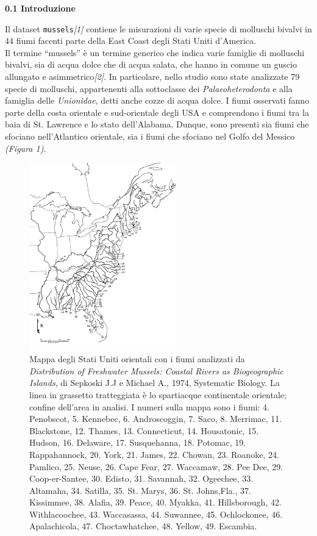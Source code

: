 \documentclass{article} %
\begin{document}
\newpage
\begin{flushleft}
\textbf{\Large 0.1 \: Introduzione}    
\end{flushleft}

Il dataset \texttt{mussels}\textit{[1]} contiene le misurazioni di varie specie di molluschi bivalvi  in 44 fiumi facenti parte della East Coast degli Stati Uniti d'America.\\ 
Il termine “mussels” è un termine generico che indica varie famiglie di molluschi bivalvi, sia di acqua dolce che di acqua salata, che hanno in comune un guscio allungato e asimmetrico\textit{[2]}. In particolare, nello studio sono state analizzate 79 specie di molluschi, appartenenti alla sottoclasse dei \textit{Palaeoheterodonta} e alla famiglia delle \textit{Unionidae}, detti anche cozze di acqua dolce. 
I fiumi osservati fanno parte della costa orientale e sud-orientale degli USA e comprendono i fiumi tra la baia di St. Lawrence e lo stato dell'Alabama. Dunque, sono presenti sia fiumi che sfociano nell'Atlantico orientale, sia i fiumi che sfociano nel Golfo del Messico \textit{(Figura 1)}. 

\begin{figure}[H]
    \centering
    \includegraphics[width=0.565\textwidth]{immagini/usa.png}
    \caption{Mappa degli Stati Uniti orientali con i fiumi analizzati da \textit{Distribution of Freshwater Mussels: Coastal Rivers as Biogeographic Islands}, di Sepkoski J.J e Michael A., 1974, Systematic Biology. La linea in grassetto tratteggiata è lo spartiacque continentale orientale; confine dell'area in analisi. I numeri sulla mappa sono i fiumi: 4. Penobscot, 5. Kennebec, 6. Androscoggin, 7. Saco, 8. Merrimac, 11. Blackstone, 12. Thames, 13. Connecticut, 14. Housatonic, 15. Hudson, 16. Delaware, 17. Susquehanna, 18. Potomac, 19. Rappahannock, 20. York, 21. James, 22. Chowan, 23. Roanoke, 24. Pamlico, 25. Neuse, 26. Cape Fear, 27. Waccamaw, 28. Pee Dee, 29. Coop-er-Santee, 30. Edisto, 31. Savannah, 32. Ogeechee, 33. Altamaha, 34. Satilla, 35. St. Marys, 36. St. Johns,Fla., 37. Kissimmee, 38. Alafia, 39. Peace, 40. Myakka, 41. Hillsborough, 42. Withlacoochee, 43. Waccasassa, 44. Suwannee, 45. Ochlockonee, 46. Apalachicola, 47. Choctawhatchee, 48. Yellow, 49. Escambia.}
\end{figure}
\end{document}
